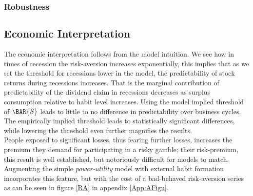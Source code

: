 \subsubsection{Robustness}


\subsection{Economic Interpretation}


The economic interpretation follows from the model intuition. We see how in times of recession the risk-aversion increases exponentially, this implies that as we set the threshold for recessions lower in the model, the predictability of stock returns during recessions increases. That is the marginal contribution of predictability of the dividend claim in recessions decreases as surplus consumption relative to habit level increases. Using the model implied threshold of ${\BAR{S}}$ leads to little to no difference in predictability over business cycles. The empirically implied threshold leads to statistically significant differences, while lowering the threshold even further magnifies the results. \\


People exposed to significant losses, thus fearing further losses, increases the premium they demand for participating in a risky gamble; their risk-premium, this result is well established, but notoriously difficult for models to match. Augmenting the simple \textit{power-utility} model with external habit formation incorporates this feature, but with the cost of a bad-behaved risk-aversion series as can be seen in figure \ref{RA} in appendix \ref{App:AFigu}.


